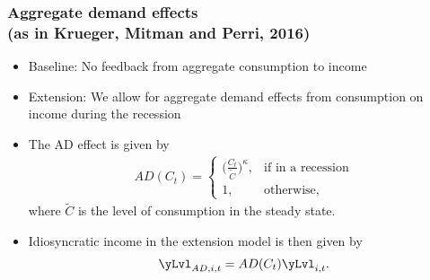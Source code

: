 \documentclass[pdflatex,aspectratio=169]{beamer}
\begin{document}
\begin{frame}
	\frametitle{Aggregate demand effects \\ 
	\small (as in Krueger, Mitman and Perri, 2016) \normalsize}
	\begin{itemize}
		\itemsep = .5\bigskipamount 
		\item Baseline: No feedback from aggregate consumption to income
		\item Extension: We allow for aggregate demand effects from consumption on income during the recession
		
		\item The AD effect is given by
		\begin{align}
			AD(C_t) =   \begin{cases}
				\Big(\frac{C_t}{\tilde{C}}\Big)^\kappa, & \text{if in a recession} \\
				1, & \text{otherwise} ,
			\end{cases}
		\end{align}
		where $\tilde{C}$ is the level of consumption in the steady state. 
		
		\item Idiosyncratic income in the extension model is then given by
		\begin{align}
			\yLvl_{AD,i,t} = AD(C_t)\yLvl_{i,t}.
		\end{align}
	\end{itemize}
\end{frame}
\end{document}
